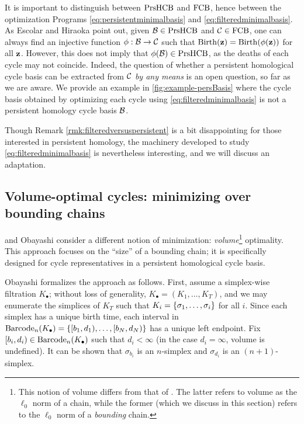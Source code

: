 \begin{remark}
\label{rmk:filteredversuspersistent}
It is important to distinguish between  $\mathrm{PrsHCB}$ and $\mathrm{FCB}$, hence between the optimization Programs \eqref{eq:persistentminimalbasis} and \eqref{eq:filteredminimalbasis}.  As Escolar and Hiraoka \cite{Escolar2016} point out, given $\mathcal B \in \mathrm{PrsHCB}$ and $\mathcal{C} \in \mathrm{FCB}$, one can always find an injective function $\phi: \mathcal B \to \mathcal{C}$ such that $\mathrm{Birth}({\mathbf z}) = \mathrm{Birth}(\phi({\mathbf z}))$ for all ${\mathbf z}$.  However, this does not imply that $\phi(\mathcal B) \in \mathrm{PrsHCB}$, as the deaths of each cycle may not coincide.  Indeed, the question of whether a persistent homological cycle basis can be extracted from $\mathcal{C}$ \emph{by any means} is an open question, so far as we are aware. We provide an example in \fig \ref{fig:example-persBasis} where the cycle basis obtained by optimizing each cycle using \pr \eqref{eq:filteredminimalbasis} is not a persistent homology cycle basis $\mathcal B$. 
\end{remark} 


Though Remark \ref{rmk:filteredversuspersistent} is a bit disappointing for those interested in persistent homology, the machinery developed to study \pr \eqref{eq:filteredminimalbasis} is nevertheless interesting, and we will discuss an adaptation.


\subsection{Volume-optimal cycles: minimizing over bounding chains}\label{sec:volume}

\DIFdelbegin {}\DIFdelend \DIFaddbegin {}\DIFaddend \cite{schweinhart2015statistical} and  Obayashi \cite{Obayashi2018} consider a different notion of minimization: \emph{volume}\footnote{This notion of volume differs from that of \cite{chenhardness}. The latter refers to volume as the $\ell_0$ norm of a chain, while the former (which we discuss in this section) refers to the $\ell_0$ norm of a \emph{bounding} chain.} optimality.  This approach focuses on the ``size'' of a bounding chain; it is specifically designed for cycle representatives in a persistent homological cycle basis.    


Obayashi \cite{Obayashi2018} formalizes the approach as follows.  First, assume a simplex-wise filtration $K_\bullet$; without loss of generality, $K_\bullet = (K_1, \ldots, K_T)$, and we may enumerate the simplices of $K_T$ such that $K_i = \{\sigma_1, \ldots, \sigma_i\}$ for all $i$.  Since each simplex has a unique birth time, each interval in  $\mathrm{Barcode}_n(K_\bullet)= \{[b_1, d_1), \ldots, [b_N, d_N)\}$ has a unique left  endpoint.  Fix $[b_i,d_i) \in \mathrm{Barcode}_n(K_\bullet)$ such that $d_i < \infty$ (in the case $d_i = \infty$, volume is undefined).    It can be shown that $\sigma_{b_i}$ is an $n$-simplex and  $\sigma_{d_i}$ is an $(n+1)$-simplex.

